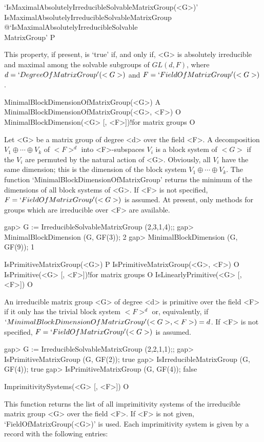 \>`IsMaximalAbsolutelyIrreducibleSolvableMatrixGroup(<G>)'%
{IsMaximalAbsolutelyIrreducibleSolvableMatrixGroup}%
@{`IsMaximalAbsolutelyIrreducibleSolvable\\MatrixGroup'} P

This property, if present, is `true' if, and only if, <G> is absolutely irreducible and maximal among 
the solvable subgroups of $GL(d, F)$, where $d = `DegreeOfMatrixGroup'(<G>)$ and
$F = `FieldOfMatrixGroup'(<G>)$. 


\>MinimalBlockDimensionOfMatrixGroup(<G>) A
\>MinimalBlockDimensionOfMatrixGroup(<G>, <F>) O
\>MinimalBlockDimension(<G> [, <F>])!{for matrix groups} O

Let <G> be a matrix group of degree <d> over the field <F>.  A 
decomposition $V_1 \oplus \cdots \oplus V_k$ of $<F>^d$ into <F>-subspaces
$V_i$ is a block system of $<G>$ if the $V_i$ are permuted by the natural
action of <G>. Obviously, all $V_i$ have the same dimension; this is the
dimension of the block system
$V_1 \oplus \cdots \oplus V_k$. The function
`MinimalBlockDimensionOfMatrixGroup' returns the minimum of the dimensions
of all block systems of <G>. If <F> is not specified, $F =
`FieldOfMatrixGroup'(<G>)$ is assumed. At present, only methods for groups 
which are irreducible over <F> are available.

\beginexample
gap> G := IrreducibleSolvableMatrixGroup (2,3,1,4);;
gap> MinimalBlockDimension (G, GF(3));
2
gap> MinimalBlockDimension (G, GF(9));
1
\endexample

\>IsPrimitiveMatrixGroup(<G>) P
\>IsPrimitiveMatrixGroup(<G>, <F>) O
\>IsPrimitive(<G> [, <F>])!{for matrix groups} O
\>IsLinearlyPrimitive(<G> [, <F>]) O

An irreducible matrix group <G> of degree <d> is primitive over the field <F> if it
only has the trivial block system $<F>^d$ or, equivalently, if
$`MinimalBlockDimensionOfMatrixGroup'(<G>, <F>) = d$. If <F> is not
specified, $F = `FieldOfMatrixGroup'(<G>)$ is assumed.

\beginexample
gap> G := IrreducibleSolvableMatrixGroup (2,2,1,1);;
gap> IsPrimitiveMatrixGroup (G, GF(2));
true
gap> IsIrreducibleMatrixGroup (G, GF(4));
true
gap> IsPrimitiveMatrixGroup (G, GF(4));
false
\endexample

\>ImprimitivitySystems(<G> [, <F>]) O

This function returns the list of all imprimitivity systems of the 
irreducible matrix group <G> over the field <F>. If <F> is not given, 
`FieldOfMatrixGroup(<G>)' is used. 
Each imprimitivity system is given by a record with the following entries:


